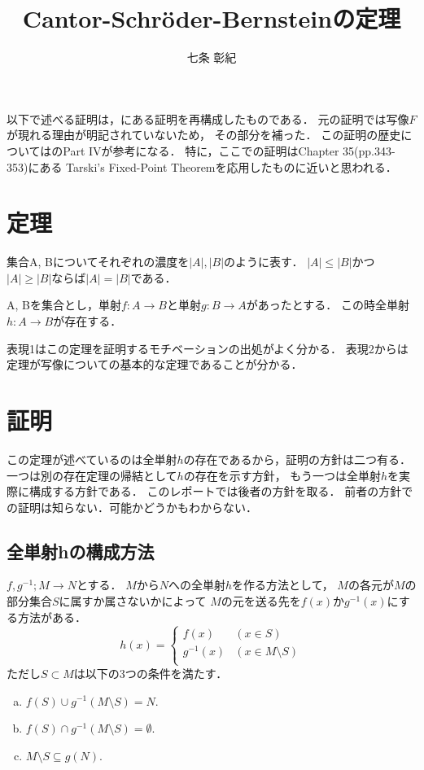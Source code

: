 \documentclass[a4j, 10pt]{jarticle}
\title{Cantor-Schr\"{o}der-Bernsteinの定理}
\author{七条 彰紀}
\begin{document}
    \maketitle
    
    以下で述べる証明は，\cite{thebook}にある証明を再構成したものである．
    元の証明では写像$F$が現れる理由が明記されていないため，
    その部分を補った．
    この証明の歴史については\cite{cbt}のPart IVが参考になる．
    特に，ここでの証明はChapter 35(pp.343-353)にある
    Tarski’s Fixed-Point Theoremを応用したものに近いと思われる．

    \section{定理}
    \begin{Them}[表現1]
        集合A, Bについてそれぞれの濃度を$|A|, |B|$のように表す．
        $|A| \leq |B|$かつ$|A| \geq |B|$ならば$|A|=|B|$である．
    \end{Them}

    \begin{Them}[表現2]
        A, Bを集合とし，単射$f:A \to B$と単射$g: B \to A$があったとする．
        この時全単射$h:A \to B$が存在する．
    \end{Them}

    表現1はこの定理を証明するモチベーションの出処がよく分かる．
    表現2からは定理が写像についての基本的な定理であることが分かる．

    \section{証明}
    この定理が述べているのは全単射$h$の存在であるから，証明の方針は二つ有る．
    一つは別の存在定理の帰結として$h$の存在を示す方針，
    もう一つは全単射$h$を実際に構成する方針である．
    このレポートでは後者の方針を取る．
    前者の方針での証明は知らない．可能かどうかもわからない．

    \subsection{全単射hの構成方法}
    $f, g^{-1}; M \to N$とする．
    $M$から$N$への全単射$h$を作る方法として，
    $M$の各元が$M$の部分集合$S$に属すか属さないかによって
    $M$の元を送る先を$f(x)$か$g^{-1}(x)$にする方法がある．
    \[
        h(x)=
        \begin{cases}
            f(x) & (x \in S) \\
            g^{-1}(x) & (x \in M \setminus S) \\
        \end{cases}
    \]
    ただし$S \subset M$は以下の3つの条件を満たす．
    \begin{enumerate}[(a)]
    \setlength{\itemindent}{3em}
        \item $f(S) \cup g^{-1}(M \setminus S)=N$.
        \item $f(S) \cap g^{-1}(M \setminus S)=\emptyset$.
        \item $M \setminus S \subseteq g(N)$.
    \end{enumerate}
\end{document}
